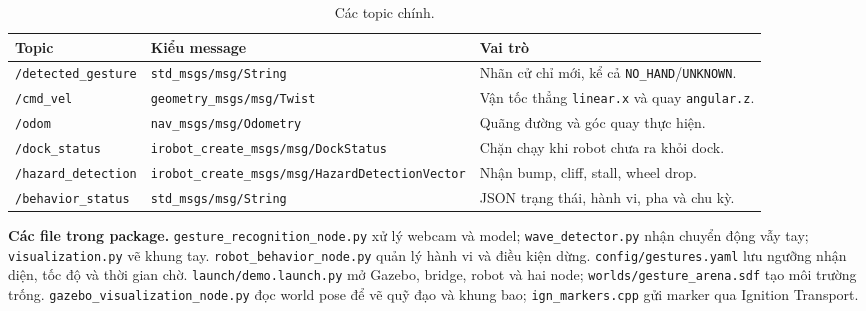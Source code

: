 \documentclass[a4paper,11pt]{article}
\newcommand{\code}[1]{\nolinkurl{#1}}
\begin{document}
\begin{table}[H]\centering\small
\begin{tabular}{@{}p{4.1cm}p{4.5cm}p{7.2cm}@{}}\toprule
Topic & Kiểu message & Vai trò\\\midrule
\code{/detected_gesture} & \code{std_msgs/msg/String} & Nhãn cử chỉ mới, kể cả \code{NO_HAND}/\code{UNKNOWN}.\\
\code{/cmd_vel} & \code{geometry_msgs/msg/Twist} & Vận tốc thẳng \code{linear.x} và quay \code{angular.z}.\\
\code{/odom} & \code{nav_msgs/msg/Odometry} & Quãng đường và góc quay thực hiện.\\
\code{/dock_status} & \code{irobot_create_msgs/msg/DockStatus} & Chặn chạy khi robot chưa ra khỏi dock.\\
\code{/hazard_detection} & \code{irobot_create_msgs/msg/HazardDetectionVector} & Nhận bump, cliff, stall, wheel drop.\\
\code{/behavior_status} & \code{std_msgs/msg/String} & JSON trạng thái, hành vi, pha và chu kỳ.\\\bottomrule
\end{tabular}
\caption{Các topic chính.}
\end{table}

\textbf{Các file trong package.}
\code{gesture_recognition_node.py} xử lý webcam và model;
\code{wave_detector.py} nhận chuyển động vẫy tay;
\code{visualization.py} vẽ khung tay.
\code{robot_behavior_node.py} quản lý hành vi và điều kiện dừng.
\code{config/gestures.yaml} lưu ngưỡng nhận diện, tốc độ và thời gian chờ.
\code{launch/demo.launch.py} mở Gazebo, bridge, robot và hai node;
\code{worlds/gesture_arena.sdf} tạo môi trường trống.
\code{gazebo_visualization_node.py} đọc world pose để vẽ quỹ đạo và khung bao;
\code{ign_markers.cpp} gửi marker qua Ignition Transport.
\clearpage
\end{document}
